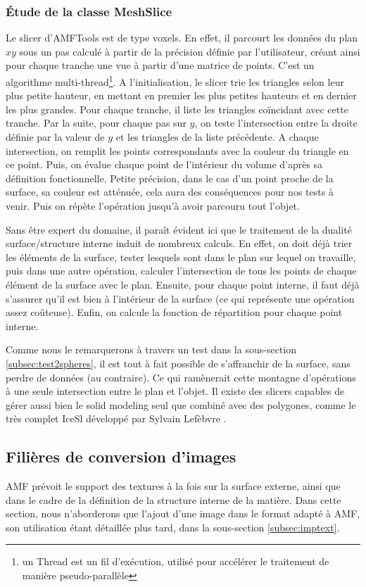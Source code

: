 \documentclass{tnreport}
\begin{document}
\subsubsection{Étude de la classe MeshSlice}
Le slicer d'AMFTools est de type voxels. En effet, il parcourt les données du plan $xy$ sous un pas calculé à partir de la précision définie par l'utilisateur, créant ainsi pour chaque tranche une vue à partir d'une matrice de points. C'est un algorithme multi-thread\footnote{un Thread est un fil d'exécution, utilisé pour accélérer le traitement de manière pseudo-parallèle}. A l'initialisation, le slicer trie les triangles selon leur plus petite hauteur, en mettant en premier les plus petites hauteurs et en dernier les plus grandes. Pour chaque tranche, il liste les triangles coïncidant avec cette tranche. Par la suite, pour chaque pas sur $y$, on teste l'intersection entre la droite définie par la valeur de $y$ et les triangles de la liste précédente. A chaque intersection, on remplit les points correspondants avec la couleur du triangle en ce point. Puis, on évalue chaque point de l'intérieur du volume d'après sa définition fonctionnelle. Petite précision, dans le cas d'un point proche de la surface, sa couleur est atténuée, cela aura des conséquences pour nos tests à venir. Puis on répète l'opération jusqu'à avoir parcouru tout l'objet. 

\label{subsec:sliceneff}
Sans être expert du domaine, il paraît évident ici que le traitement de la dualité surface/structure interne induit de nombreux calculs. En effet, on doit déjà trier les éléments de la surface, tester lesquels sont dans le plan sur lequel on travaille, puis dans une autre opération, calculer l'intersection de tous les points de chaque élément de la surface avec le plan. Ensuite, pour chaque point interne, il faut déjà s'assurer qu'il est bien à l'intérieur de la surface (ce qui représente une opération assez coûteuse). Enfin, on calcule la fonction de répartition pour chaque point interne. 

Comme nous le remarquerons à travers un test dans la sous-section \ref{subsec:test2spheres}, il est tout à fait possible de s'affranchir de la surface, sans perdre de données (au contraire). Ce qui ramènerait cette montagne d'opérations à une seule intersection entre le plan et l'objet. Il existe des slicers capables de gérer aussi bien le solid modeling seul que combiné avec des polygones, comme le très complet IceSl développé par Sylvain Lefèbvre \cite{IceSL}.

\subsection{Filières de conversion d'images}
\label{subsec:conv}
AMF prévoit le support des textures à la fois sur la surface externe, ainsi que dans le cadre de la définition de la structure interne de la matière.  Dans cette section, nous n'aborderons que l'ajout d'une image dans le format adapté à AMF, son utilisation étant détaillée plus tard, dans la sous-section \ref{subsec:imptext}.
\end{document}
